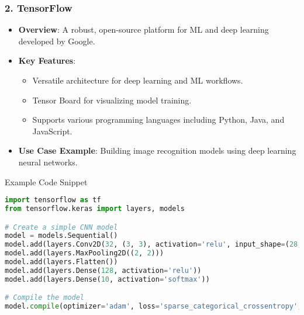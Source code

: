 \documentclass[aspectratio=169]{beamer}
\begin{document}
\begin{frame}[fragile]
    \frametitle{2. TensorFlow}
    \begin{itemize}
        \item \textbf{Overview}: A robust, open-source platform for ML and deep learning developed by Google.
        \item \textbf{Key Features}:
        \begin{itemize}
            \item Versatile architecture for deep learning and ML workflows.
            \item Tensor Board for visualizing model training.
            \item Supports various programming languages including Python, Java, and JavaScript.
        \end{itemize}
        \item \textbf{Use Case Example}: Building image recognition models using deep learning neural networks.
    \end{itemize}

    \begin{block}{Example Code Snippet}
    \begin{lstlisting}[language=Python]
import tensorflow as tf
from tensorflow.keras import layers, models

# Create a simple CNN model
model = models.Sequential()
model.add(layers.Conv2D(32, (3, 3), activation='relu', input_shape=(28, 28, 1)))
model.add(layers.MaxPooling2D((2, 2)))
model.add(layers.Flatten())
model.add(layers.Dense(128, activation='relu'))
model.add(layers.Dense(10, activation='softmax'))

# Compile the model
model.compile(optimizer='adam', loss='sparse_categorical_crossentropy', metrics=['accuracy'])
    \end{lstlisting}
    \end{block}
\end{frame}
\end{document}
